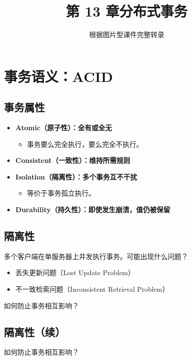 \documentclass[UTF8,a4paper,11pt]{ctexart}
\title{第 13 章\quad 分布式事务}
\author{根据图片型课件完整转录}
\date{}
\begin{document}
\maketitle
\tableofcontents
\newpage

\section{事务语义：ACID}

\subsection{事务属性}

\begin{itemize}
  \item \textbf{Atomic（原子性）：全有或全无}
  \begin{itemize}
    \item 事务要么完全执行，要么完全不执行。
  \end{itemize}
  \item \textbf{Consistent（一致性）：维持所需规则}
  \item \textbf{Isolation（隔离性）：多个事务互不干扰}
  \begin{itemize}
    \item 等价于事务孤立执行。
  \end{itemize}
  \item \textbf{Durability（持久性）：即使发生崩溃，值仍被保留}
\end{itemize}

\subsection{隔离性}

多个客户端在单服务器上并发执行事务。可能出现什么问题？

\begin{itemize}
  \item 丢失更新问题（Lost Update Problem）
  \item 不一致检索问题（Inconsistent Retrieval Problem）
\end{itemize}

如何防止事务相互影响？

\subsection{隔离性（续）}

如何防止事务相互影响？
\end{document}
